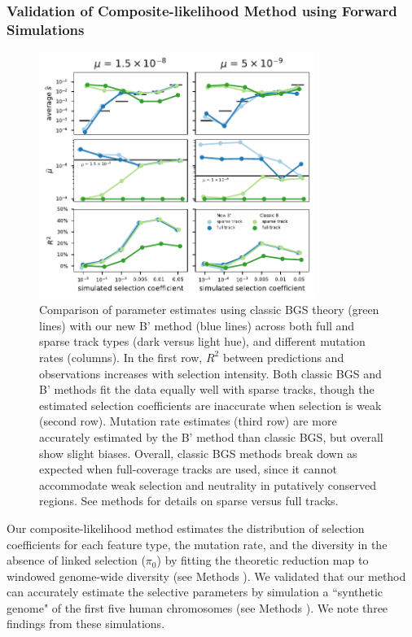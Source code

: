 \documentclass[11pt]{article}
\begin{document}
\subsubsection*{Validation of Composite-likelihood Method using Forward
Simulations}

\begin{figure}[htbp] \centering
    \includegraphics[width=0.8\textwidth]{figures/figure_2.pdf} 

    \caption{Comparison of parameter estimates using classic BGS theory (green
        lines) with our new B' method (blue lines) across both full and sparse
        track types (dark versus light hue), and different mutation rates
        (columns). In the first row, $R^2$ between predictions and observations
        increases with selection intensity. Both classic BGS and B' methods fit
        the data equally well with sparse tracks, though the estimated
        selection coefficients are inaccurate when selection is weak (second
        row). Mutation rate estimates (third row) are more accurately estimated
        by the B' method than classic BGS, but overall show slight biases.
        Overall, classic BGS methods break down as expected when full-coverage tracks
    are used, since it cannot accommodate weak selection and neutrality in putatively
    conserved regions. See methods for details on sparse versus full tracks.
    }

  \label{fig:figure-2}
\end{figure}

Our composite-likelihood method estimates the distribution
of selection coefficients for each feature type, the mutation rate, and the
diversity in the absence of linked selection ($\pi_0$) by fitting the theoretic
reduction map to windowed genome-wide diversity (see Methods
). We validated that our method can accurately
estimate the selective parameters by simulation a ``synthetic
genome" of the first five human chromosomes (see Methods
). We note three findings from these simulations.
\end{document}
